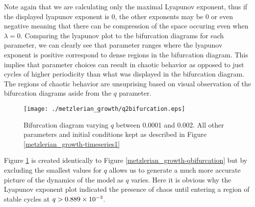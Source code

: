 Note again that we are calculating only the maximal Lyapunov exponent, thus if the displayed lyapunov exponent is 0, the other exponents may be 0 or even negative meaning that there can be compression of the space occuring even when $\lambda=0$. Comparing the lyapunov plot to the bifurcation diagrams for each parameter, we can clearly see that parameter ranges where the lyapunov exponent is positive correspond to dense regions in the bifurcation diagram. This implies that parameter choices can result in chaotic behavior as opposed to just cycles of higher periodicity than what was displayed in the bifurcation diagram. The regions of chaotic behavior are unsuprising based on visual observation of the bifurcation diagrams aside from the $q$ parameter.
\begin{figure}
    \centering
    \texttt{[image: ./metzlerian\_growth/q2bifurcation.eps]}
    \caption{Bifurcation diagram varying $q$ between 0.0001 and 0.002. All other parameters and initial conditions kept as described in Figure \ref{metzlerian_growth-timeseries1}}
    \label{metzlerian_growth-qbifurcation_zoom}
\end{figure}
Figure \ref{metzlerian_growth-qbifurcation_zoom} is created identically to Figure \ref{metzlerian_growth-qbifurcation} but by excluding the smallest values for $q$ allows us to generate a much more accurate picture of the dynamics of the model as $q$ varies. Here it is obvious why the Lyapunov exponent plot indicated the presence of chaos until entering a region of stable cycles at $q>\num{0.889d-3}$.












